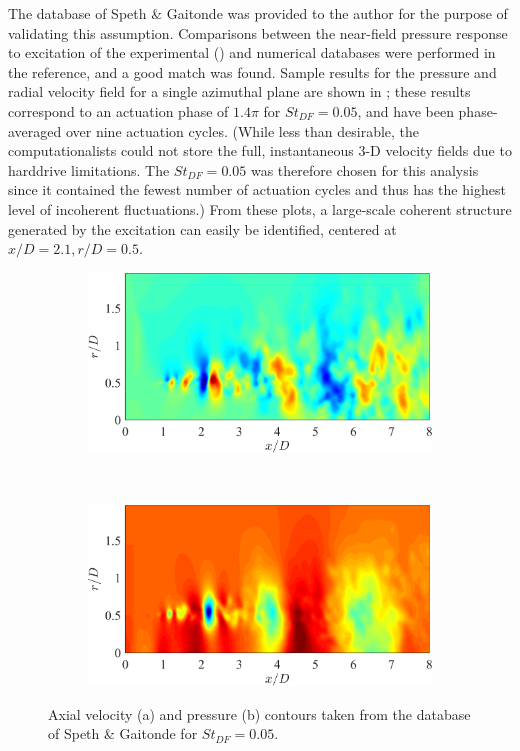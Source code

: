 The database of Speth \& Gaitonde \citep{Speth2014} was provided to the author for the purpose of validating this assumption.
Comparisons between the near-field pressure response to excitation of the experimental () and numerical databases were performed in the reference, and a good match was found.
Sample results for the pressure and radial velocity field for a single azimuthal plane are shown in ; these results correspond to an actuation phase of $1.4 \pi$ for $St_{DF} = 0.05$, and have been phase-averaged over nine actuation cycles.
(While less than desirable, the computationalists could not store the full, instantaneous 3-D velocity fields due to harddrive limitations. The $St_{DF} = 0.05$ was therefore chosen for this analysis since it contained the fewest number of actuation cycles and thus has the highest level of incoherent fluctuations.)
From these plots, a large-scale coherent structure generated by the excitation can easily be identified, centered at $x/D = 2.1, r/D = 0.5$.
\begin{figure}
	\centering
	\begin{subfigure}{0.75\textwidth}
		\centering
		\includegraphics[width=0.95\linewidth]{Figures/LES_phavg_streamwise_Ur.png}
		\caption{}
	\end{subfigure}\\
	\begin{subfigure}{0.75\textwidth}
		\centering
		\includegraphics[width=0.95\linewidth]{Figures/LES_phavg_streamwise_p.png}
		\caption{}
	\end{subfigure}
	\caption{Axial velocity (a) and pressure (b) contours taken from the database of Speth \& Gaitonde \citep{Speth2014} for $St_{DF} = 0.05$.}
	\label{fig:LES_streamwise_phavg}
\end{figure}

